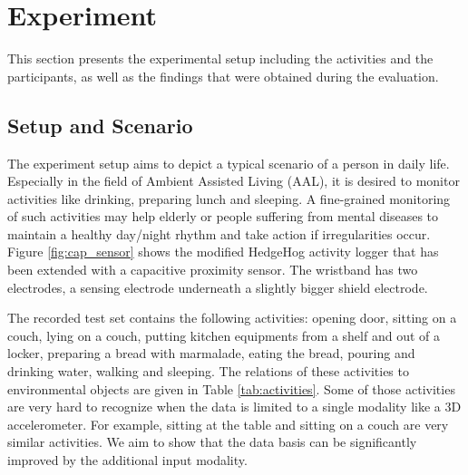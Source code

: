 \documentclass[runningheads,a4paper]{llncs}
\begin{document}
\section{Experiment}
\label{sect:experiment}

This section presents the experimental setup including the activities and the participants, as well as the findings that were obtained during the evaluation.

\subsection{Setup and Scenario}

The experiment setup aims to depict a typical scenario of a person in daily life. Especially in the field of Ambient Assisted Living (AAL), it is desired to monitor activities like drinking, preparing lunch and sleeping. A fine-grained monitoring of such activities may help elderly or people suffering from mental diseases to maintain a healthy day/night rhythm and take action if irregularities occur. Figure \ref{fig:cap_sensor} shows the modified HedgeHog activity logger that has been extended with a capacitive proximity sensor. The wristband has two electrodes, a sensing electrode underneath a slightly bigger shield electrode. 

The recorded test set contains the following activities: opening door, sitting on a couch, lying on a couch, putting kitchen equipments from a shelf and out of a locker, preparing a bread with marmalade, eating the bread, pouring and drinking water, walking and sleeping. The relations of these activities to environmental objects are given in Table \ref{tab:activities}. Some of those activities are very hard to recognize when the data is limited to a single modality like a 3D accelerometer. For example, sitting at the table and sitting on a couch are very similar activities. We aim to show that the data basis can be significantly improved by the additional input modality. 
\end{document}
